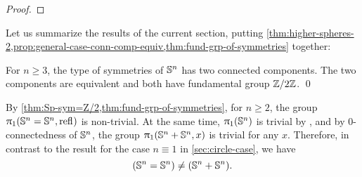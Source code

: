 \documentclass[english,a4paper]{lmcs}
\begin{document}
\begin{proof}
\end{proof}


Let us summarize the results of the current section, putting \cref{thm:higher-spheres-2,prop:general-case-conn-comp-equiv,thm:fund-grp-of-symmetries} together:

\begin{thm}
    For $n \geq 3$, the type of symmetries of ${\mathbb S^{n}}$ has two connected components. The two components are equivalent and both have fundamental group $\mathbb{Z} \slash 2\mathbb{Z}$. \qed
\end{thm}


\begin{rem}\label{rem:not-generalising}
	By \cref{thm:Sp-sym=Z/2,thm:fund-grp-of-symmetries}, for $n \geq 2$, the group $\uppi_{1}({\mathbb S^{n}} = {\mathbb S^{n}}, \mathop{{\mathrm{refl}}_{}})$ is non-trivial. At the same time, $\uppi_{1}({\mathbb S^{n}})$ is trivial by \cite{HoTT}, and by $0$-connectedness of ${\mathbb S^{n}}$, the group
	$\uppi_{1}({\mathbb S^{n}} + {\mathbb S^{n}}, x)$ is trivial for any $x$.
	Therefore, in contrast to the result for the case $n \equiv 1$ in \cref{sec:circle-case}, we have
	\begin{equation}
	({\mathbb S^{n}} = {\mathbb S^{n}}) \not= ({\mathbb S^{n}} + {\mathbb S^{n}}).
	\end{equation}
\end{rem}
\end{document}
